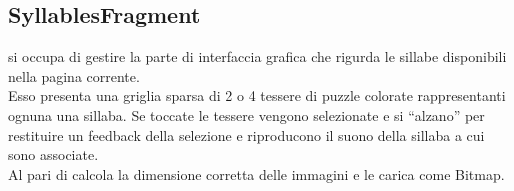 \subsection{SyllablesFragment}
\label{sec:syllables_fragment}

 si occupa di gestire la parte di interfaccia grafica che rigurda le sillabe disponibili nella pagina corrente.\\
Esso presenta una griglia sparsa di 2 o 4 tessere di puzzle colorate rappresentanti ognuna una sillaba. Se toccate le tessere vengono selezionate e si ``alzano'' per restituire un feedback della selezione e riproducono il suono della sillaba a cui sono associate.\\
Al pari di  calcola la dimensione corretta delle immagini e le carica come Bitmap.
